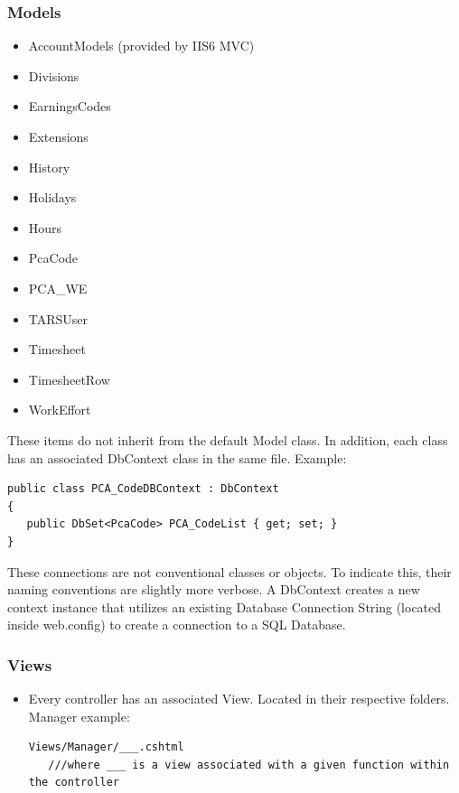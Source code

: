 \documentclass[letterpaper]{article}
\begin{document}
\subsubsection{Models}
\begin{itemize}
\item AccountModels (provided by IIS6 MVC)
\item Divisions
\item EarningsCodes
\item Extensions
\item History
\item Holidays
\item Hours
\item PcaCode
\item PCA\_WE
\item TARSUser
\item Timesheet
\item TimesheetRow
\item WorkEffort
\end{itemize}
These items do not inherit from the default Model class. In addition, each class has an associated DbContext class in the same file. Example:
\begin{verbatim}
public class PCA_CodeDBContext : DbContext
{
   public DbSet<PcaCode> PCA_CodeList { get; set; }
}
\end{verbatim}
These connections are not conventional classes or objects. To indicate this, their naming conventions are slightly more verbose. A DbContext creates a new context instance that utilizes an existing Database Connection String (located inside web.config) to create a connection to a SQL Database.
\subsubsection{Views}
\begin{itemize}
\item Every controller has an associated View. Located in their respective folders. Manager example:
\begin{verbatim}
Views/Manager/___.cshtml 
   ///where ___ is a view associated with a given function within the controller
\end{verbatim}
\end{itemize}
\end{document}
